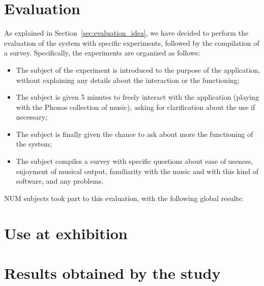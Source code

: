 \section{Evaluation}
As explained in Section~\ref{sec:evaluation_idea}, we have decided to perform the evaluation of the system with specific experiments, followed by the compilation of a survey.
Specifically, the experiments are organized as follows:
\begin{itemize}
\item The subject of the experiment is introduced to the purpose of the application, without explaining any details about the interaction or the functioning;
\item The subject is given 5 minutes to freely interact with the application (playing with the Phonos collection of music), asking for clarification about the use if necessary;
\item The subject is finally given the chance to ask about more the functioning of the system;
\item The subject compiles a survey with specific questions about ease of useness, enjoyment of musical output, familiarity with the music and with this kind of software, and any problems. 
\end{itemize}

NUM subjects took part to this evaluation, with the following global results:


\section{Use at exhibition} 
\section{Results obtained by the study}